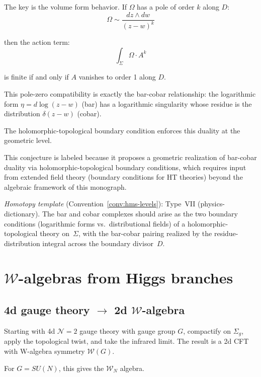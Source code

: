 \begin{evidence}
The key is the volume form behavior. If $\Omega$ has a pole of order $k$ along 
$D$:
\[\Omega \sim \frac{dz \wedge dw}{(z-w)^k}\]

then the action term:
\[\int_{\Sigma} \Omega \cdot A^k\]

is finite if and only if $A$ vanishes to order 1 along $D$.

This pole-zero compatibility is exactly the bar-cobar relationship: the logarithmic form $\eta = d\log(z-w)$ (bar) has a logarithmic singularity whose residue is the distribution $\delta(z-w)$ (cobar).

The holomorphic-topological boundary condition enforces this duality at the
geometric level.
\end{evidence}

\begin{remark}[Scope]
This conjecture is labeled \ClaimStatusHeuristic{} because it proposes a geometric
realization of bar-cobar duality via holomorphic-topological boundary conditions,
which requires input from extended field theory (boundary conditions for HT theories)
beyond the algebraic framework of this monograph.

\emph{Homotopy template} (Convention~\ref{conv:hms-levels}): Type~VII (physics-dictionary).
The bar and cobar complexes should arise as the two boundary conditions (logarithmic forms vs.\ distributional fields) of a holomorphic-topological theory on~$\Sigma$, with the bar-cobar pairing realized by the residue-distribution integral across the boundary divisor~$D$.
\end{remark}

\section{$\mathcal{W}$-algebras from Higgs branches}

\subsection{\texorpdfstring{4d gauge theory $\to$ 2d $\mathcal{W}$-algebra}{4d gauge theory -> 2d $\mathcal{W}$-algebra}}

\begin{conjecture}
\label{conj:costello-gaiotto-agt}
Starting with 4d $\mathcal{N}=2$ gauge theory with gauge group $G$, compactify on $\Sigma_g$, apply the topological twist, and take the infrared limit.  The result is a 2d CFT with W-algebra symmetry $\mathcal{W}(G)$.

For $G = SU(N)$, this gives the $\mathcal{W}_N$ algebra.
\end{conjecture}

